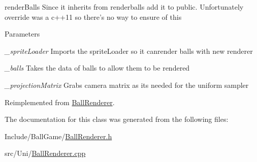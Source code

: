 renderBalls Since it inherits from renderballs add it to public. Unfortunately override was a c++11 so there's no way to ensure of this 
\begin{DoxyParams}{Parameters}
\item[{\em \_\-spriteLoader}]Imports the spriteLoader so it canrender balls with new renderer \item[{\em \_\-balls}]Takes the data of balls to allow them to be rendered \item[{\em \_\-projectionMatrix}]Grabs camera matrix as its needed for the uniform sampler \end{DoxyParams}


Reimplemented from \hyperlink{classBallRenderer_a11d6402983ed53ab7f3d3353244110da}{BallRenderer}.

The documentation for this class was generated from the following files:\begin{DoxyCompactItemize}
\item 
Include/BallGame/\hyperlink{BallRenderer_8h}{BallRenderer.h}\item 
src/Uni/\hyperlink{BallRenderer_8cpp}{BallRenderer.cpp}\end{DoxyCompactItemize}
